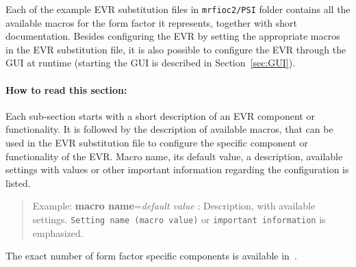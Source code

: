 \documentclass[12pt,a4paper]{article}
\begin{document}
Each of the example EVR substitution files in \texttt{mrfioc2/PSI} folder contains all the available macros for the form factor it represents, together with short documentation. Besides configuring the EVR by setting the appropriate macros in the EVR substitution file, it is also possible to configure the EVR through the GUI at runtime (starting the GUI is described in Section~\ref{sec:GUI}).


\paragraph{How to read this section:}
Each sub-section starts with a short description of an EVR component or functionality. It is followed by the description of available macros, that can be used in the EVR substitution file to configure the specific component or functionality of the EVR.
Macro name, its default value, a description, available settings with values or other important information regarding the configuration is listed.
\begin{quote}
Example: \textbf{macro name}=\emph{default value} : Description, with available settings. \texttt{Setting name (macro value)} or \texttt{important information} is emphasized.
\end{quote}
The exact number of form factor specific components is available in~\cite{mrm_evr}. 

\end{document}
